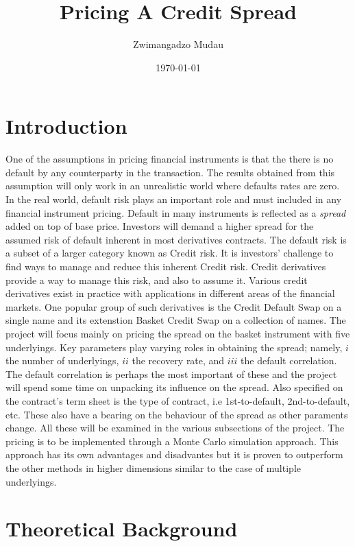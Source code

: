 \documentclass[a4paper,12pt]{article}
\begin{document}
\title{Pricing A Credit Spread}
\author{Zwimangadzo Mudau}
\date{\today}

\maketitle

\tableofcontents

\section{Introduction}
One of the assumptions in pricing financial instruments is that the there is no default by any counterparty in the transaction. The results obtained from this assumption will only work in an unrealistic world where defaults rates are zero. In the real world, default risk plays an important role and must included in any financial instrument pricing. Default in many instruments is reflected as a \textit{spread} added on top of base price. Investors will demand a higher spread for the assumed risk of default inherent in most derivatives contracts. The default risk is a subset of a larger category known as Credit risk. It is investors' challenge to find ways to manage and reduce this inherent Credit risk. Credit derivatives provide a way to manage this risk, and also to assume it. Various credit derivatives exist in practice with applications in different areas of the financial markets. One popular group of such derivatives is the Credit Default Swap on a single name and its extenstion Basket Credit Swap on a collection of names. The project will focus mainly on pricing the spread on the basket instrument with five underlyings. Key parameters play varying roles in obtaining the spread; namely, \(i\) the number of underlyings, \(ii\) the recovery rate, and \(iii\) the default correlation. The default correlation is perhaps the most important of these and the project will spend some time on unpacking its influence on the spread. Also specified on the contract's term sheet is the type of contract, i.e 1st-to-default, 2nd-to-default, etc. These also have a bearing on the behaviour of the spread as other paraments change. All these will be examined in the various subsections of the project. The pricing is to be implemented through a Monte Carlo simulation approach. This approach has its own advantages and disadvantes but it is proven to outperform the other methods in higher dimensions similar to the case of multiple underlyings. 

\section{Theoretical Background}
\end{document}
